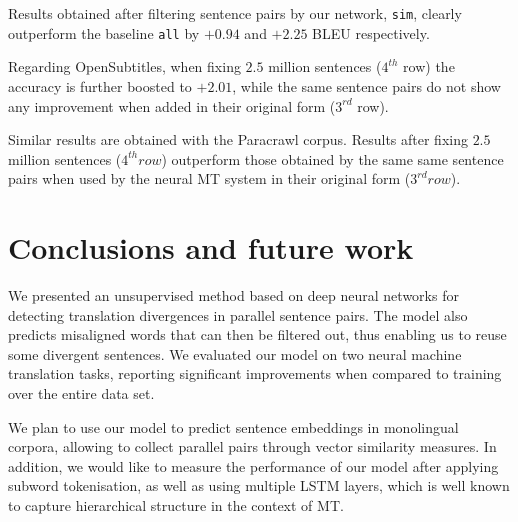 \documentclass[11pt,a4paper]{article}
\begin{document}
Results obtained after filtering sentence pairs by our network, \texttt{sim}, clearly outperform the baseline \texttt{all} by $+0.94$ and $+2.25$ BLEU respectively.

Regarding OpenSubtitles, when fixing $2.5$ million sentences ($4^{th}$ row) the accuracy is further boosted to $+2.01$, while the same sentence pairs do not show any improvement when added in their original form ($3^{rd}$ row).

Similar results are obtained with the Paracrawl corpus. Results after fixing $2.5$ million sentences ($4^{th} row$) outperform those obtained by the same same sentence pairs when used by the neural MT system in their original form ($3^{rd} row$).

\section{Conclusions and future work}
\label{conclusions+further}

We presented an unsupervised method based on deep neural networks for detecting translation divergences in parallel sentence pairs. 
The model also predicts misaligned words that can then be filtered
out, thus enabling us to reuse some divergent sentences. 
We evaluated our model on two neural machine translation tasks, 
reporting significant improvements when compared to training over the entire data set. 

We plan to use our model to predict sentence embeddings in monolingual corpora, allowing to collect parallel pairs through vector similarity measures.
In addition, we would like to measure the performance of our model after applying subword tokenisation,
as well as using multiple LSTM layers, which is well known to capture hierarchical structure in the context of MT.




\end{document}
